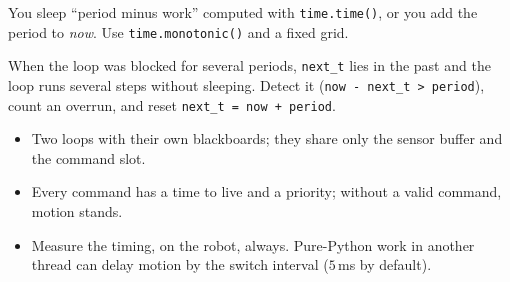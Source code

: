 \begin{troublebox}
\begin{description}[leftmargin=0.6cm,nosep]
  \item[The loop slowly drifts] You sleep ``period minus work'' computed with \verb!time.time()!, or you add the period to \emph{now}. Use \verb!time.monotonic()! and a fixed grid.
  \item[After a long pause the loop races] When the loop was blocked for several periods, \verb!next_t! lies in the past and the loop runs several steps without sleeping. Detect it (\verb!now - next_t > period!), count an overrun, and reset \verb!next_t = now + period!.
\end{description}
\end{troublebox}

\begin{keyidea}
\begin{itemize}[nosep]
  \item Two loops with their own blackboards; they share only the sensor buffer and the command slot.
  \item Every command has a time to live and a priority; without a valid command, motion stands.
  \item Measure the timing, on the robot, always. Pure-Python work in another thread can delay motion by the switch interval ($5$\,ms by default).
\end{itemize}
\end{keyidea}

